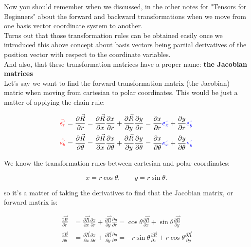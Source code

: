 Now you should remember when we discussed, in the other notes for "Tensors for Beginners" about the 
forward and backward transformations when we move from one basis vector coordinate system to another.\\
Turns out that those transformation rules can be obtained easily once we introduced this above
concept about basis vectors being partial derivatives of the position vector with respect to the 
coordinate variables.\\
And also, that these transformation matrices have a proper name: \textbf{the Jacobian matrices}\\

Let's say we want to find the forward transformation matrix (the Jacobian) matric when moving 
from cartesian to polar coordinates. This would be just a matter of applying the chain rule:

\begin{align*}
    \begingroup\color{red}\tilde{\vec{e_r}}\endgroup &= \frac{\partial \vec{R}}{\partial r} = \frac{\partial \vec{R}}{\partial x}\frac{\partial x}{\partial r} + \frac{\partial \vec{R}}{\partial y}\frac{\partial y}{\partial r} = \frac{\partial x}{\partial r}\begingroup\color{blue}\vec{e_x}\endgroup + \frac{\partial y}{\partial r}\begingroup\color{blue}\vec{e_y}\endgroup\\
    \begingroup\color{red}\tilde{\vec{e_\theta}}\endgroup &= \frac{\partial \vec{R}}{\partial \theta} = \frac{\partial \vec{R}}{\partial x}\frac{\partial x}{\partial \theta} + \frac{\partial \vec{R}}{\partial y}\frac{\partial y}{\partial \theta} = \frac{\partial x}{\partial \theta}\begingroup\color{blue}\vec{e_x}\endgroup + \frac{\partial y}{\partial \theta}\begingroup\color{blue}\vec{e_y}\endgroup
\end{align*}

We know the transformation rules between cartesian and polar coordinates:

\[
x = r \cos\theta,
\qquad
y = r \sin\theta.
\]

so it's a matter of taking the derivatives to find that the Jacobian matrix, or forward matrix is:

\begin{align*}
    \frac{\partial \vec{R}}{\partial r} &= \frac{\partial \vec{R}}{\partial x}\frac{\partial x}{\partial r} + \frac{\partial \vec{R}}{\partial y}\frac{\partial y}{\partial r} = \cos\theta \frac{\partial \vec{R}}{\partial x} + \sin\theta \frac{\partial \vec{R}}{\partial y}\\
    \frac{\partial \vec{R}}{\partial \theta} &= \frac{\partial \vec{R}}{\partial x}\frac{\partial x}{\partial \theta} + \frac{\partial \vec{R}}{\partial y}\frac{\partial y}{\partial \theta} = -r\sin\theta \frac{\partial \vec{R}}{\partial x} + r\cos\theta \frac{\partial \vec{R}}{\partial y}
\end{align*}

